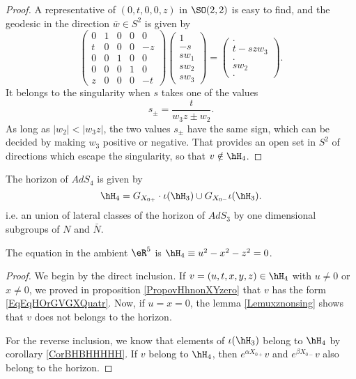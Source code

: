 \begin{proof}
A representative of $(0,t,0,0,z)$ in $\SO(2,2)$ is easy to find, and the geodesic in the direction $\bar w\in S^2$ is given by
\begin{equation}
	\begin{pmatrix}
 0	&	1	&	0	&	0	&	0\\ 
 t	&	0	&	0	&	0	&	-z\\ 
 0	&	0	&	1	&	0	&	0\\ 
 0	&	0	&	0	&	1	&	0\\ 
z	&	0	&	0	&	0	&	-t 
 \end{pmatrix}
\begin{pmatrix}
	1	\\ 
	-s	\\ 
	sw_1	\\ 
	sw_2	\\ 
	sw_3	
\end{pmatrix}=
\begin{pmatrix}
	.	\\ 
	t-szw_3	\\ 
	.	\\ 
	sw_2	\\ 
	.	
\end{pmatrix}.
\end{equation}
It belongs to the singularity when $s$ takes one of the values
\begin{equation}
	s_{\pm}=\frac{ t }{ w_3z\pm w_2 }.
\end{equation}
As long as $|w_2|<|w_3z|$, the two values $s_{\pm}$ have the same sign, which can be decided by making $w_3$ positive or negative. That provides an open set in $S^2$ of directions which escape the singularity, so that $v\notin\hH_4$.
\end{proof}


\begin{theorem}			\label{ThoHorQuatreInclusionHorTrois}\label{ThoEqHorQCoore}
	The horizon of $AdS_4$ is given by
	\begin{equation}		\label{EqEqHOrGVGXQuatr}
		\hH_4=G_{X_{0+}}\cdot \iota(\hH_3)\cup G_{X_{0-}}\iota(\hH_3).
	\end{equation}
	i.e. an union of lateral classes of the horizon of $AdS_3$ by one dimensional subgroups of $N$ and $\bar N$.

	The equation in the ambient $\eR^5$ is $\hH_4\equiv u^2-x^2-z^2=0$.
\end{theorem}

\begin{proof}
	We begin by the direct inclusion. If $v=(u,t,x,y,z)\in\hH_4$ with $u\neq 0$ or $x\neq 0$, we proved in proposition \ref{PropovHhnonXYzero} that $v$ has the form \eqref{EqEqHOrGVGXQuatr}. Now, if $u=x=0$, the lemma \ref{Lemuxznonsing} shows that $v$ does not belongs to the horizon.

	For the reverse inclusion, we know that elements of $\iota(\hH_3)$ belong to $\hH_4$ by corollary \ref{CorBHBHHHHH}. If $v$ belong to $\hH_4$, then $ e^{\alpha X_{0+}}v$ and $ e^{\beta X_{0-}}v$ also belong to the horizon.
\end{proof}

